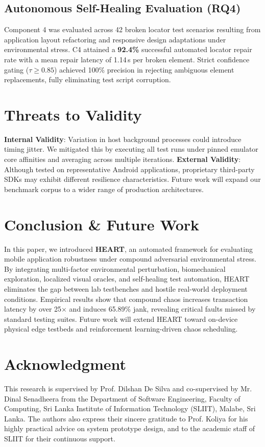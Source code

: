 \documentclass[conference]{IEEEtran}
\begin{document}
\subsection{Autonomous Self-Healing Evaluation (RQ4)}
Component 4 was evaluated across 42 broken locator test scenarios resulting from application layout refactoring and responsive design adaptations under environmental stress. C4 attained a \textbf{92.4\%} successful automated locator repair rate with a mean repair latency of 1.14\,s per broken element. Strict confidence gating ($\tau \ge 0.85$) achieved 100\% precision in rejecting ambiguous element replacements, fully eliminating test script corruption.

\section{Threats to Validity}
\textbf{Internal Validity}: Variation in host background processes could introduce timing jitter. We mitigated this by executing all test runs under pinned emulator core affinities and averaging across multiple iterations.  
\textbf{External Validity}: Although tested on representative Android applications, proprietary third-party SDKs may exhibit different resilience characteristics. Future work will expand our benchmark corpus to a wider range of production architectures.

\section{Conclusion \& Future Work}
In this paper, we introduced \textbf{HEART}, an automated framework for evaluating mobile application robustness under compound adversarial environmental stress. By integrating multi-factor environmental perturbation, biomechanical exploration, localized visual oracles, and self-healing test automation, HEART eliminates the gap between lab testbenches and hostile real-world deployment conditions. Empirical results show that compound chaos increases transaction latency by over 25$\times$ and induces 65.89\% jank, revealing critical faults missed by standard testing suites. Future work will extend HEART toward on-device physical edge testbeds and reinforcement learning-driven chaos scheduling.

\section*{Acknowledgment}
This research is supervised by Prof. Dilshan De Silva and co-supervised by Mr. Dinal Senadheera from the Department of Software Engineering, Faculty of Computing, Sri Lanka Institute of Information Technology (SLIIT), Malabe, Sri Lanka. The authors also express their sincere gratitude to Prof. Koliya for his highly practical advice on system prototype design, and to the academic staff of SLIIT for their continuous support.



\end{document}
